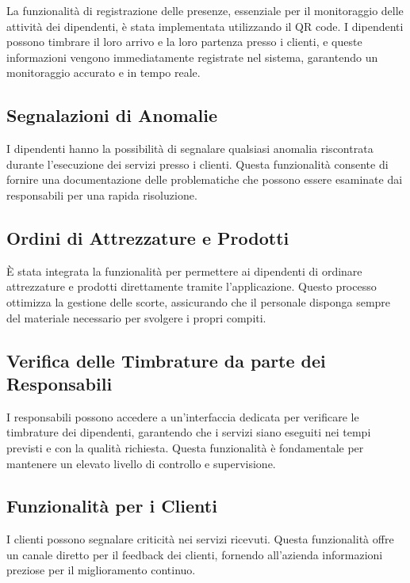 \documentclass[twoside]{supsistudent}
\begin{document}
La funzionalità di registrazione delle presenze, essenziale per il monitoraggio delle attività dei dipendenti, è stata implementata utilizzando il QR code. I dipendenti possono timbrare il loro arrivo e la loro partenza presso i clienti, e queste informazioni vengono immediatamente registrate nel sistema, garantendo un monitoraggio accurato e in tempo reale.

\subsection{Segnalazioni di Anomalie}

I dipendenti hanno la possibilità di segnalare qualsiasi anomalia riscontrata durante l'esecuzione dei servizi presso i clienti. Questa funzionalità consente di fornire una documentazione delle problematiche che possono essere esaminate dai responsabili per una rapida risoluzione.

\subsection{Ordini di Attrezzature e Prodotti}

È stata integrata la funzionalità per permettere ai dipendenti di ordinare attrezzature e prodotti direttamente tramite l'applicazione. Questo processo ottimizza la gestione delle scorte, assicurando che il personale disponga sempre del materiale necessario per svolgere i propri compiti.

\subsection{Verifica delle Timbrature da parte dei Responsabili}

I responsabili possono accedere a un'interfaccia dedicata per verificare le timbrature dei dipendenti, garantendo che i servizi siano eseguiti nei tempi previsti e con la qualità richiesta. Questa funzionalità è fondamentale per mantenere un elevato livello di controllo e supervisione.

\subsection{Funzionalità per i Clienti}

I clienti possono segnalare criticità nei servizi ricevuti. Questa funzionalità offre un canale diretto per il feedback dei clienti, fornendo all'azienda informazioni preziose per il miglioramento continuo.
\end{document}
